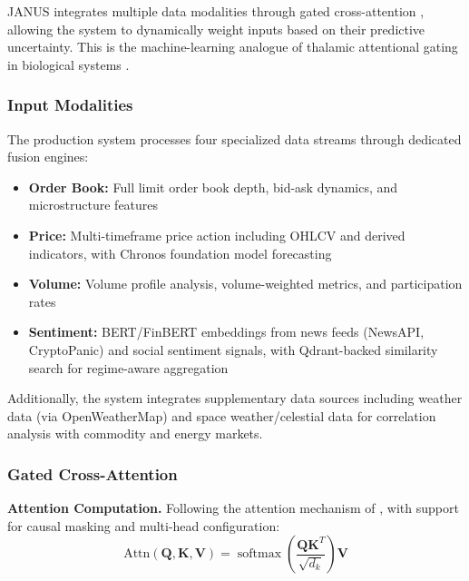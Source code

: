 \documentclass[12pt, a4paper]{article}
\DeclareMathOperator{\softmax}{softmax}
\begin{document}
JANUS integrates multiple data modalities through gated cross-attention \citep{alayrac2022flamingo}, allowing the system to dynamically weight inputs based on their predictive uncertainty. This is the machine-learning analogue of thalamic attentional gating in biological systems \citep{halassa2017thalamic, george2025thalamic}.

\subsubsection{Input Modalities}
\label{sec:input_modalities}

The production system processes four specialized data streams through dedicated fusion engines:

\begin{itemize}
	\item \textbf{Order Book:} Full limit order book depth, bid-ask dynamics, and microstructure features
	\item \textbf{Price:} Multi-timeframe price action including OHLCV and derived indicators, with Chronos foundation model forecasting \citep{ansari2024chronos, ansari2024chronos2}
	\item \textbf{Volume:} Volume profile analysis, volume-weighted metrics, and participation rates
	\item \textbf{Sentiment:} BERT/FinBERT embeddings \citep{candle2024} from news feeds (NewsAPI, CryptoPanic) and social sentiment signals, with Qdrant-backed similarity search for regime-aware aggregation
\end{itemize}

Additionally, the system integrates supplementary data sources including weather data (via OpenWeatherMap) and space weather/celestial data for correlation analysis with commodity and energy markets.

\subsubsection{Gated Cross-Attention}
\label{sec:gated_attention}

\textbf{Attention Computation.}
Following the attention mechanism of \citet{vaswani2017attention}, with support for causal masking and multi-head configuration:
\begin{equation}
	\text{Attn}(\mathbf{Q}, \mathbf{K}, \mathbf{V}) = \softmax\left(\frac{\mathbf{Q}\mathbf{K}^T}{\sqrt{d_k}}\right)\mathbf{V}
\end{equation}
\end{document}
